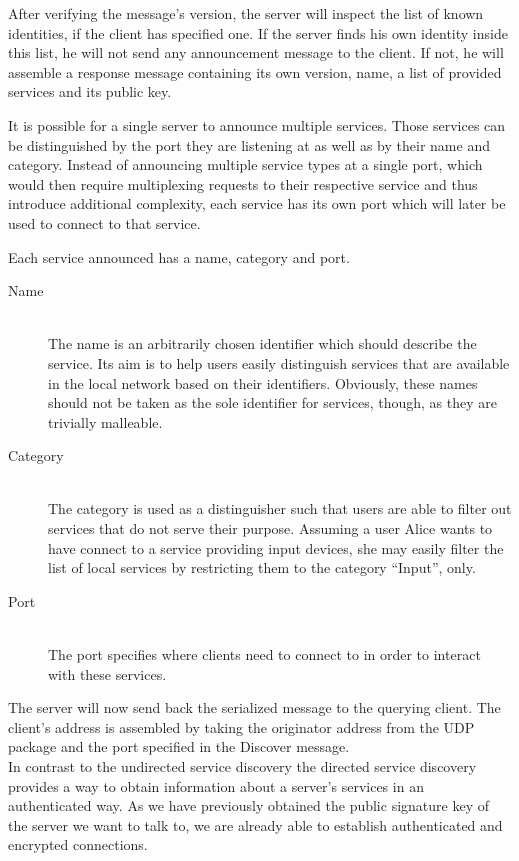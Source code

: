 After verifying the message's version, the server will inspect the list of known identities, if the client has specified one.
If the server finds his own identity inside this list, he will not send any announcement message to the client.
If not, he will assemble a response message containing its own version, name, a list of provided services and its public key.

It is possible for a single server to announce multiple services.
Those services can be distinguished by the port they are listening at as well as by their name and category.
Instead of announcing multiple service types at a single port, which would then require multiplexing requests to their respective service and thus introduce additional complexity, each service has its own port which will later be used to connect to that service.

Each service announced has a name, category and port.
\begin{description}
    \item[Name]\hfill\\
        The name is an arbitrarily chosen identifier which should describe the service.
        Its aim is to help users easily distinguish services that are available in the local network based on their identifiers.
        Obviously, these names should not be taken as the sole identifier for services, though, as they are trivially malleable.
    \item[Category]\hfill\\
        The category is used as a distinguisher such that users are able to filter out services that do not serve their purpose.
        Assuming a user Alice wants to have connect to a service providing input devices, she may easily filter the list of local services by restricting them to the category ``Input'', only.
    \item[Port]\hfill\\
        The port specifies where clients need to connect to in order to interact with these services.
\end{description}

The server will now send back the serialized message to the querying client.
The client's address is assembled by taking the originator address from the UDP package and the port specified in the Discover message.\\

In contrast to the undirected service discovery the directed service discovery provides a way to obtain information about a server's services in an authenticated way.
As we have previously obtained the public signature key of the server we want to talk to, we are already able to establish authenticated and encrypted connections.

